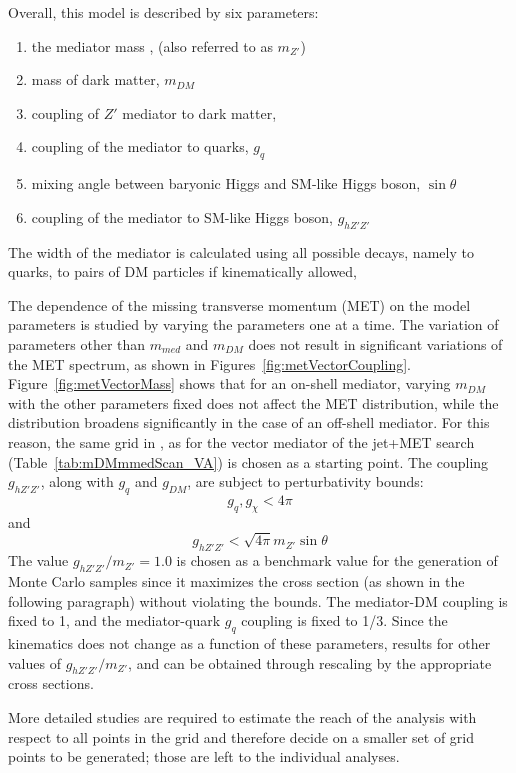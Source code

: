 Overall, this model is described by six parameters:
\begin{enumerate}
	\item the mediator mass \mmed, (also referred to as $m_{Z'}$)
	\item mass of dark matter, $m_{DM}$
	\item coupling of $Z'$ mediator to dark matter, \gdm
	\item coupling of the mediator to quarks, $g_q$
	\item mixing angle between baryonic Higgs and SM-like Higgs boson, $\sin\theta$
	\item coupling of the mediator to SM-like Higgs boson, $g_{hZ'Z'}$
\end{enumerate}
The width of the mediator is calculated using all possible decays, 
namely to quarks, to pairs of DM particles if kinematically allowed, 

The dependence of the missing transverse momentum (MET) on the model parameters 
is studied by varying the parameters one at a time. The variation of parameters 
other than $m_{med}$ and $m_{DM}$ does not result in significant 
variations of the MET spectrum, as shown in Figures~\ref{fig:metVectorCoupling}. 
Figure~\ref{fig:metVectorMass} shows that for an on-shell mediator, 
varying $m_{DM}$ with the other parameters fixed does not affect the MET distribution, while 
the distribution broadens significantly in the case of an off-shell mediator. 
For this reason, the same grid in \mmed, \mdm as for the vector mediator
of the jet+MET search (Table~\ref{tab:mDMmmedScan_VA}) is chosen as a starting point. 
The coupling $g_{hZ'Z'}$, along with $g_q$ and $g_{DM}$, are subject to perturbativity bounds:
$$g_q, g_\chi < 4\pi $$ and $$  g_{hZ'Z'} < \sqrt{4\pi}m_{Z'}\sin\theta$$ 
The value $g_{hZ'Z'}/m_{Z'} = 1.0$ is chosen as a benchmark value for the generation 
of Monte Carlo samples since it maximizes the cross section (as shown in the following paragraph)
without violating the bounds. The mediator-DM coupling \gdm is fixed to 1, and  
the mediator-quark $g_{q}$ coupling is fixed to 1/3. 
Since the kinematics does not change as a function of these parameters, 
results for other values of  $g_{hZ'Z'}/m_{Z'}$, \gdm and \gq can be 
obtained through rescaling by the appropriate cross sections. 

More detailed studies are required to estimate the reach of the analysis with respect to all points in the grid
and therefore decide on a smaller set of grid points to be generated; 
those are left to the individual analyses. 

